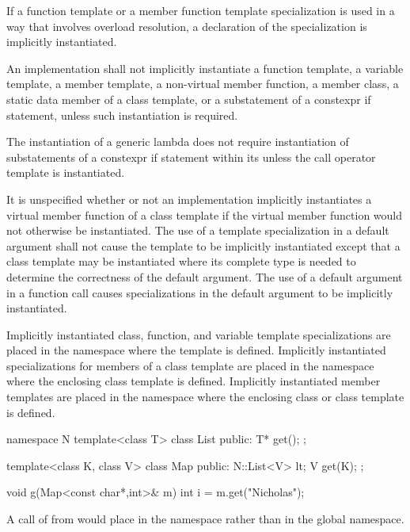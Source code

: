 \pnum
If a function template or a member function template specialization is used in
a way that involves overload resolution,
a declaration of the specialization is implicitly instantiated.

\pnum
An implementation shall not implicitly instantiate a function template,
a variable template,
a member template, a non-virtual member function, a member class, a
static data member of a class template, or a substatement of a constexpr if
statement, unless such instantiation is required.
\begin{note}
The instantiation of a generic lambda
does not require instantiation of
substatements of a constexpr if statement
within its 
unless the call operator template is instantiated.
\end{note}
It is unspecified whether or not an implementation implicitly instantiates a
virtual member function of a class template if the virtual member function would
not otherwise be instantiated.
The use of a template specialization in a default argument
shall not cause the template to be implicitly instantiated except that a
class template may be instantiated where its complete type is needed to determine
the correctness of the default argument.
The use of a default argument in a
function call causes specializations in the default argument to be implicitly
instantiated.

\pnum
Implicitly instantiated class, function, and variable template specializations
are placed in the namespace where the template is defined.
Implicitly instantiated specializations for members of a class template are
placed in the namespace where the enclosing class template is defined.
Implicitly instantiated member templates are placed in the namespace where the
enclosing class or class template is defined.
\begin{example}
\begin{codeblock}
namespace N {
  template<class T> class List {
  public:
    T* get();
  };
}

template<class K, class V> class Map {
public:
  N::List<V> lt;
  V get(K);
};

void g(Map<const char*,int>& m) {
  int i = m.get("Nicholas");
}
\end{codeblock}

A call of
from
would place
in the namespace
rather than in the global namespace.
\end{example}

